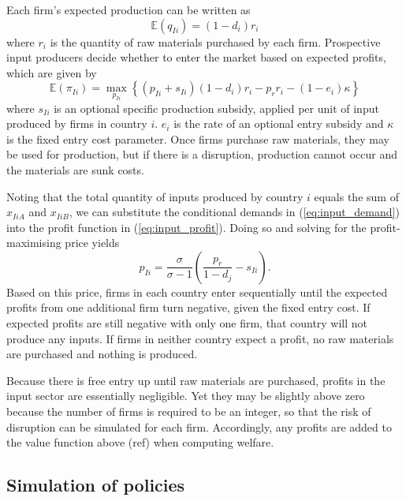 \documentclass{article}
\begin{document}
Each firm's expected production can be written as
\begin{equation}
    \mathbb{E} (q_{Ii}) = (1 - d_i) r_i
\end{equation}
where $r_i$ is the quantity of raw materials purchased by each firm. Prospective input producers decide whether to enter the market based on expected profits, which are given by
\begin{equation} \label{eq:input_profit}
    \mathbb{E} (\pi_{Ii}) = \max_{p_{Ii}} \left\{ (p_{Ii} + s_{Ii}) (1 - d_i) r_{i} - p_r r_i - (1 - e_i) \kappa \right\}
\end{equation}
where $s_{Ii}$ is an optional specific production subsidy, applied per unit of input produced by firms in country $i$. $e_i$ is the rate of an optional entry subsidy and $\kappa$ is the fixed entry cost parameter. Once firms purchase raw materials, they may be used for production, but if there is a disruption, production cannot occur and the materials are sunk costs.

Noting that the total quantity of inputs produced by country $i$ equals the sum of $x_{IiA}$ and $x_{IiB}$, we can substitute the conditional demands in (\ref{eq:input_demand}) into the profit function in (\ref{eq:input_profit}). Doing so and solving for the profit-maximising price yields
\begin{equation}
    p_{Ii} = \frac{\sigma}{\sigma - 1} \left( \frac{p_r}{1 - d_j} - s_{Ii} \right) .
\end{equation}
Based on this price, firms in each country enter sequentially until the expected profits from one additional firm turn negative, given the fixed entry cost. If expected profits are still negative with only one firm, that country will not produce any inputs. If firms in neither country expect a profit, no raw materials are purchased and nothing is produced.

Because there is free entry up until raw materials are purchased, profits in the input sector are essentially negligible. Yet they may be slightly above zero because the number of firms is required to be an integer, so that the risk of disruption can be simulated for each firm. Accordingly, any profits are added to the value function above (ref) when computing welfare.

\subsection{Simulation of policies}
\end{document}
